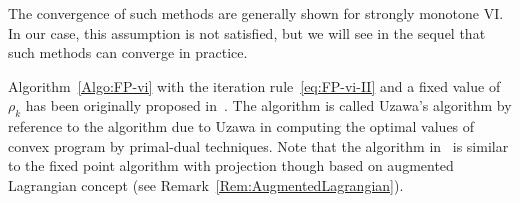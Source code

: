 {%
The convergence of such methods are generally shown for strongly monotone VI.
In our case, this assumption is not satisfied, but we will see in the sequel that such methods can converge in practice. 
\begin{remark}
  Algorithm~\ref{Algo:FP-vi} with the iteration
  rule~\eqref{eq:FP-vi-II} and a fixed value of $\rho_k$ has been
  originally proposed in~\cite{DeSaxce.Feng90,DeSaxce.Feng1998}. The
  algorithm is called Uzawa's algorithm by reference to the algorithm
  due to Uzawa in computing the optimal values of convex program by
  primal-dual
  techniques\cite{Glowinski.ea1976,Fortin.Glowinski_Book1983}. Note that the
    algorithm in~\citep{Simo.Laursen1992} is similar to the fixed
    point algorithm with projection though based on augmented
    Lagrangian concept (see Remark~\ref{Rem:AugmentedLagrangian}). 
\end{remark}

}
